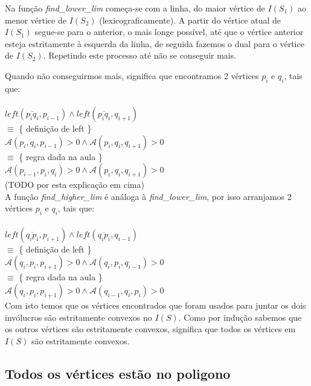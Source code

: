 \documentclass[11pt]{article}
\begin{document}
Na função \textit{find\_lower\_lim} começa-se com a linha,
do maior vértice de $I(S_1)$ ao menor vértice de $I(S_2)$ (lexicograficamente).
A partir do vértice atual de $I(S_1)$ segue-se para o anterior, o mais 
longe possível, até que o vértice anterior esteja estritamente à
esquerda da linha, de seguida fazemos o dual para o vértice de $I(S_2)$.
Repetindo este processo até não se conseguir mais.
\par

Quando não conseguirmos mais, significa que encontramos 2 vértices 
$p_i$ e $q_i$, tais que:\\
\\
$left(\overline{p_i q_i}, p_{i-1}) \wedge left(\overline{p_i q_i}, q_{i+1})$\\
$\equiv$ \{ definição de left \}\\
$\mathcal{A}(p_i, q_i, p_{i-1}) > 0 \wedge \mathcal{A}(p_i, q_i, q_{i+1}) > 0$\\
$\equiv$ \{ regra dada na aula \}\\
$\mathcal{A}(p_{i-1}, p_i, q_i) > 0 \wedge \mathcal{A}(p_i, q_i, q_{i+1}) > 0$\\
(TODO por esta explicação em cima)\\

A função \textit{find\_higher\_lim} é análoga à \textit{find\_lower\_lim},
por isso arranjamos 2 vértices $p_i$ e $q_i$, tais que:\\
\\
$left(\overline{q_i p_i}, p_{i+1}) \wedge left(\overline{q_i p_i}, q_{i-1})$\\
$\equiv$ \{ definição de left \}\\
$\mathcal{A}(q_i, p_i, p_{i+1}) > 0 \wedge \mathcal{A}(q_i, p_i, q_{i-1}) > 0$\\
$\equiv$ \{ regra dada na aula \}\\
$\mathcal{A}(q_i, p_i, p_{i+1}) > 0 \wedge \mathcal{A}(q_{i-1}, q_i, p_i) > 0$\\

Com isto temos que os vértices encontrados que foram 
usados para juntar os dois invólucros são estritamente
convexos no $I(S)$. Como por indução sabemos que os 
outros vértices são estritamente convexos, significa
que todos os vértices em $I(S)$ são estritamente convexos.




\subsection{Todos os vértices estão no poligono}
\end{document}
